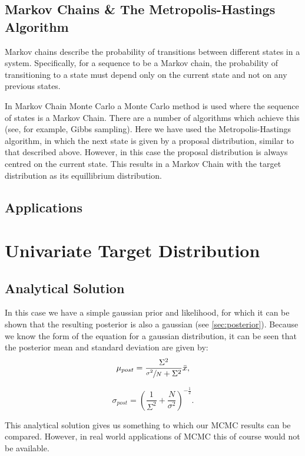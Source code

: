 \documentclass[a4paper,11pt,twoside]{article}
\begin{document}
\subsection{Markov Chains \& The Metropolis-Hastings Algorithm}
Markov chains describe the probability of transitions between different states
in a system. Specifically, for a sequence to be a Markov chain, the
probability of transitioning to a state must depend only on the current state
and not on any previous states.

In Markov Chain Monte Carlo a Monte Carlo method is used where the sequence of
states is a Markov Chain. There are a number of algorithms which achieve this
(see, for example, Gibbs sampling).
Here we have used the Metropolis-Hastings algorithm, in which the next state is
given by a proposal distribution, similar to that described above. However,
in this case the proposal distribution is always centred on the current state.
This results in a Markov Chain with the target distribution as its equillibrium
distribution.

\subsection{Applications}

\section{Univariate Target Distribution}

\subsection{Analytical Solution}
In this case we have a simple gaussian prior and likelihood, for which it can be shown
that the resulting posterior is also a gaussian (see \cref{sec:posterior}).
Because we know the form of the equation for a gaussian distribution, it can be
seen that the posterior mean and standard deviation are given by:
\begin{equation}
	\mu_{post} = \frac{\Sigma^2}{\sfrac{\sigma^2}{N} + \Sigma^2} \bar{x},
\end{equation}

\begin{equation}
	\sigma_{post} = \left( \frac{1}{\Sigma^2} + \frac{N}{\sigma^2} \right)^{-\frac{1}{2}}.
\end{equation}

This analytical solution gives us something to which our MCMC results can be
compared. However, in real world applications of MCMC this of course would not
be available.
\end{document}
